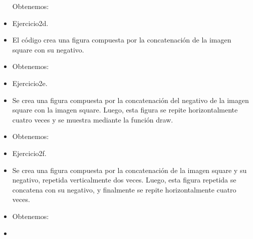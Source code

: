 \documentclass{article}
\begin{document}
\begin{itemize}
        Obtenemos: 
        \item[ ]{}

        Ejercicio2d.
        \item El código crea una figura compuesta por la concatenación de la imagen square con su negativo.
        \item[ ]{}
       
        Obtenemos:
        \item[ ]{}

        Ejercicio2e.
        \item Se crea una figura compuesta por la concatenación del negativo de la imagen square con la imagen square. Luego, esta figura se repite horizontalmente cuatro veces y se muestra mediante la función draw.
        \item[ ]{}
       
        Obtenemos:
        \item[ ]{}

        Ejercicio2f.
        \item Se crea una figura compuesta por la concatenación de la imagen square y su negativo, repetida verticalmente dos veces. Luego, esta figura repetida se concatena con su negativo, y finalmente se repite horizontalmente cuatro veces.
        \item[ ]{}
       
        Obtenemos:
        \item[ ]{}


\end{itemize}
\end{document}
